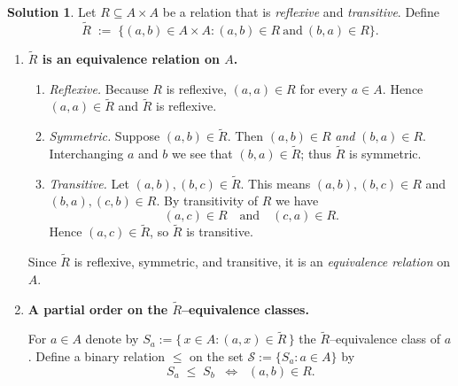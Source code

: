 \documentclass[12pt]{article}
\theoremstyle{definition} %
\newtheorem{solution}{Solution}
\theoremstyle{plain} %
\begin{document}
      \begin{solution}
        Let $R\subseteq A\times A$ be a relation that is \emph{reflexive} and \emph{transitive}.
        Define
        \[
           \widetilde R\;:=\;\bigl\{(a,b)\in A\times A : (a,b)\in R\ \text{and}\ (b,a)\in R\bigr\}.
        \]
        
        \begin{enumerate}[label=(\alph*)]
        
        \item \textbf{$\widetilde R$ is an equivalence relation on $A$.}
        
        \begin{enumerate}[label=\textbf{\roman*.},wide=0pt, itemsep=4pt]
          \item \emph{Reflexive.}  
                Because $R$ is reflexive, $(a,a)\in R$ for every $a\in A$.
                Hence $(a,a)\in\widetilde R$ and $\widetilde R$ is reflexive.
        
          \item \emph{Symmetric.}  
                Suppose $(a,b)\in\widetilde R$.  
                Then $(a,b)\in R$ \emph{and} $(b,a)\in R$.  
                Interchanging $a$ and $b$ we see that $(b,a)\in\widetilde R$; thus
                $\widetilde R$ is symmetric.
        
          \item \emph{Transitive.}  
                Let $(a,b),(b,c)\in\widetilde R$.  
                This means $(a,b),(b,c)\in R$ and $(b,a),(c,b)\in R$.
                By transitivity of $R$ we have
                \[
                    (a,c)\in R
                    \quad\text{and}\quad
                    (c,a)\in R.
                \]
                Hence $(a,c)\in\widetilde R$, so $\widetilde R$ is transitive.
        \end{enumerate}
        Since $\widetilde R$ is reflexive, symmetric, and transitive, it is an
        \emph{equivalence relation} on $A$.
        
        \item \textbf{A partial order on the $\widetilde R$--equivalence classes.}
        
        For $a\in A$ denote by
        \(
           S_a:=\{\,x\in A : (a,x)\in \widetilde R\,\}
        \)
        the $\widetilde R$--equivalence class of $a$.
        Define a binary relation $\le$ on the set
        \(\mathcal{S}:=\{S_a:a\in A\}\) by
        \[
           S_a\;\le\;S_b
           \;\;\Longleftrightarrow\;\;
           (a,b)\in R.
        \]
        

\end{enumerate}
\end{solution}
\end{document}
